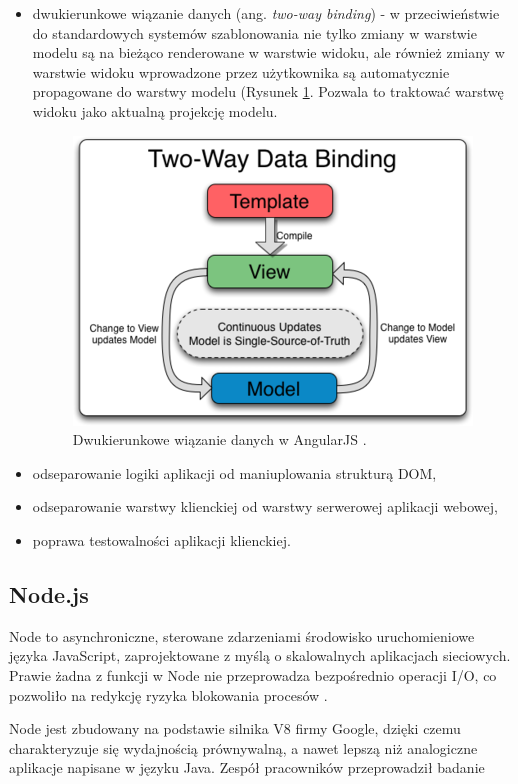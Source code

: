 \begin{itemize}
	\item dwukierunkowe wiązanie danych (ang. \textit{two-way binding}) - w przeciwieństwie do standardowych systemów szablonowania nie tylko zmiany w warstwie modelu są na bieżąco renderowane w warstwie widoku, ale również zmiany w warstwie widoku wprowadzone przez użytkownika są automatycznie propagowane do warstwy modelu (Rysunek \ref{angular:two_way}. Pozwala to traktować warstwę widoku jako aktualną projekcję modelu.
		\begin{figure}
			\centering
    		\includegraphics[scale=0.5]{img/Two_Way_Data_Binding.png}
    		\caption{Dwukierunkowe wiązanie danych w AngularJS \cite{angular}.}
    		\label{angular:two_way}
		\end{figure}

	\item odseparowanie logiki aplikacji od maniuplowania strukturą DOM,
	\item odseparowanie warstwy klienckiej od warstwy serwerowej aplikacji webowej,
	\item poprawa testowalności aplikacji klienckiej.
\end{itemize}

\subsection{Node.js}

Node to asynchroniczne, sterowane zdarzeniami środowisko uruchomieniowe języka JavaScript, zaprojektowane z myślą o skalowalnych aplikacjach sieciowych. Prawie żadna z funkcji w Node nie przeprowadza bezpośrednio operacji I/O, co pozwoliło na redykcję ryzyka blokowania procesów \cite{node}.

Node jest zbudowany na podstawie silnika V8 firmy Google, dzięki czemu charakteryzuje się wydajnością prównywalną, a nawet lepszą niż analogiczne aplikacje napisane w języku Java. Zespół pracowników przeprowadził badanie \cite{}